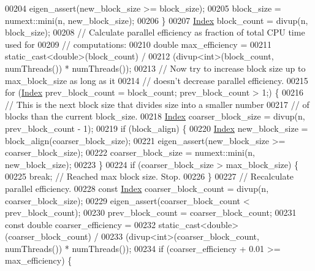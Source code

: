 \begin{DoxyCode}
00204       eigen\_assert(new\_block\_size >= block\_size);
00205       block\_size = numext::mini(n, new\_block\_size);
00206     \}
00207     \hyperlink{namespace_eigen_a62e77e0933482dafde8fe197d9a2cfde}{Index} block\_count = divup(n, block\_size);
00208     \textcolor{comment}{// Calculate parallel efficiency as fraction of total CPU time used for}
00209     \textcolor{comment}{// computations:}
00210     \textcolor{keywordtype}{double} max\_efficiency =
00211         \textcolor{keyword}{static\_cast<}\textcolor{keywordtype}{double}\textcolor{keyword}{>}(block\_count) /
00212         (divup<int>(block\_count, numThreads()) * numThreads());
00213     \textcolor{comment}{// Now try to increase block size up to max\_block\_size as long as it}
00214     \textcolor{comment}{// doesn't decrease parallel efficiency.}
00215     \textcolor{keywordflow}{for} (\hyperlink{namespace_eigen_a62e77e0933482dafde8fe197d9a2cfde}{Index} prev\_block\_count = block\_count; prev\_block\_count > 1;) \{
00216       \textcolor{comment}{// This is the next block size that divides size into a smaller number}
00217       \textcolor{comment}{// of blocks than the current block\_size.}
00218       \hyperlink{namespace_eigen_a62e77e0933482dafde8fe197d9a2cfde}{Index} coarser\_block\_size = divup(n, prev\_block\_count - 1);
00219       \textcolor{keywordflow}{if} (block\_align) \{
00220         \hyperlink{namespace_eigen_a62e77e0933482dafde8fe197d9a2cfde}{Index} new\_block\_size = block\_align(coarser\_block\_size);
00221         eigen\_assert(new\_block\_size >= coarser\_block\_size);
00222         coarser\_block\_size = numext::mini(n, new\_block\_size);
00223       \}
00224       \textcolor{keywordflow}{if} (coarser\_block\_size > max\_block\_size) \{
00225         \textcolor{keywordflow}{break};  \textcolor{comment}{// Reached max block size. Stop.}
00226       \}
00227       \textcolor{comment}{// Recalculate parallel efficiency.}
00228       \textcolor{keyword}{const} \hyperlink{namespace_eigen_a62e77e0933482dafde8fe197d9a2cfde}{Index} coarser\_block\_count = divup(n, coarser\_block\_size);
00229       eigen\_assert(coarser\_block\_count < prev\_block\_count);
00230       prev\_block\_count = coarser\_block\_count;
00231       \textcolor{keyword}{const} \textcolor{keywordtype}{double} coarser\_efficiency =
00232           \textcolor{keyword}{static\_cast<}\textcolor{keywordtype}{double}\textcolor{keyword}{>}(coarser\_block\_count) /
00233           (divup<int>(coarser\_block\_count, numThreads()) * numThreads());
00234       \textcolor{keywordflow}{if} (coarser\_efficiency + 0.01 >= max\_efficiency) \{

\end{DoxyCode}
